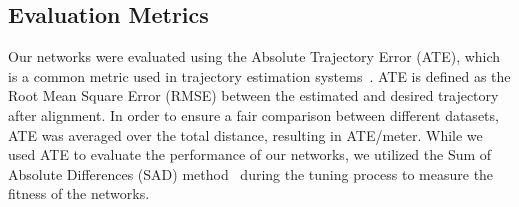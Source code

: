 \subsection{Evaluation Metrics}
Our networks were evaluated using the Absolute Trajectory Error (ATE), which is a common metric used in trajectory estimation systems~\cite{zhang2018tutorial}. ATE is defined as the Root Mean Square Error (RMSE) between the estimated and desired trajectory after alignment. In order to ensure a fair comparison between different datasets, ATE was averaged over the total distance, resulting in ATE/meter. While we used ATE to evaluate the performance of our networks, we utilized the Sum of Absolute Differences (SAD) method~\cite{milford2012seqslam} during the tuning process to measure the fitness of the networks.

%
%
%

%
%
%




